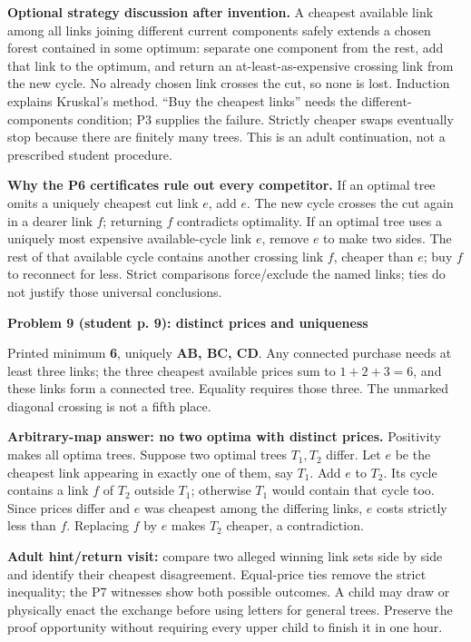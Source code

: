 \documentclass[11pt,letterpaper]{article}
\newcommand\task[2]{\par\vspace{3pt}\textbf{Problem #1 (student p. #1): #2}\par}
\begin{document}
\textbf{Optional strategy discussion after invention.} A cheapest available link among all links joining different current components safely extends a chosen forest contained in some optimum: separate one component from the rest, add that link to the optimum, and return an at-least-as-expensive crossing link from the new cycle. No already chosen link crosses the cut, so none is lost. Induction explains Kruskal's method. ``Buy the cheapest links'' needs the different-components condition; P3 supplies the failure. Strictly cheaper swaps eventually stop because there are finitely many trees. This is an adult continuation, not a prescribed student procedure.

\textbf{Why the P6 certificates rule out every competitor.} If an optimal tree omits a uniquely cheapest cut link $e$, add $e$. The new cycle crosses the cut again in a dearer link $f$; returning $f$ contradicts optimality. If an optimal tree uses a uniquely most expensive available-cycle link $e$, remove $e$ to make two sides. The rest of that available cycle contains another crossing link $f$, cheaper than $e$; buy $f$ to reconnect for less. Strict comparisons force/exclude the named links; ties do not justify those universal conclusions.

\task{9}{distinct prices and uniqueness}
Printed minimum \textbf{6}, uniquely \textbf{AB, BC, CD}. Any connected purchase needs at least three links; the three cheapest available prices sum to $1+2+3=6$, and these links form a connected tree. Equality requires those three. The unmarked diagonal crossing is not a fifth place.

\textbf{Arbitrary-map answer: no two optima with distinct prices.} Positivity makes all optima trees. Suppose two optimal trees $T_1,T_2$ differ. Let $e$ be the cheapest link appearing in exactly one of them, say $T_1$. Add $e$ to $T_2$. Its cycle contains a link $f$ of $T_2$ outside $T_1$; otherwise $T_1$ would contain that cycle too. Since prices differ and $e$ was cheapest among the differing links, $e$ costs strictly less than $f$. Replacing $f$ by $e$ makes $T_2$ cheaper, a contradiction.

\textbf{Adult hint/return visit:} compare two alleged winning link sets side by side and identify their cheapest disagreement. Equal-price ties remove the strict inequality; the P7 witnesses show both possible outcomes. A child may draw or physically enact the exchange before using letters for general trees. Preserve the proof opportunity without requiring every upper child to finish it in one hour.
\newpage
\end{document}
